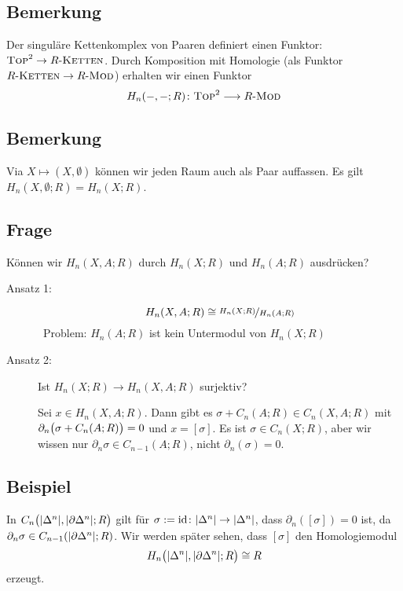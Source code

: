 \subsection[Definition: Der singuläre Kettenkomplex von Paaren definiert einen Funktor]{Bemerkung} %
\label{sub:83}
Der singuläre Kettenkomplex von Paaren definiert einen Funktor: $\TOP^2 \to R\text{-}\textsc{Ketten}$. Durch Komposition mit Homologie (als Funktor 
$R\text{-}\textsc{Ketten} \to R\text{-}\MOD$) erhalten wir einen Funktor
\[
	H_n(-,-;R) \colon \TOP^2 \longrightarrow R\text{-}\MOD
\]

\subsection[Bemerkung: Topologische Räume als Paar auffassen]{Bemerkung} %
\label{sub:84}
Via $X \mapsto (X,\emptyset)$ können wir jeden Raum auch als Paar auffassen. Es gilt $H_n(X,\emptyset;R) = H_n(X;R)$.

\subsection[Frage: Können wir $H_n(X,A;R)$ durch $H_n(X;R)$ und $H_n(A;R)$ ausdrücken?]{Frage} %
\label{sub:85}
Können wir $H_n(X,A;R)$ durch $H_n(X;R)$ und $H_n(A;R)$ ausdrücken? 
\begin{description}
	\item[Ansatz 1:] 
	\[
		H_n(X,A;R) \cong \nicefrac{H_n(X;R)}{H_n(A;R)}
	\]
	\ifxetexorluatex \faWarningSign \fi \, Problem: $H_n(A;R)$ ist kein Untermodul von $H_n(X;R)$
	\item[Ansatz 2:] Ist $H_n(X;R) \to H_n(X,A;R)$ surjektiv?
	
	Sei $x \in H_n(X,A;R)$. Dann gibt es $\sigma + C_n(A;R) \in C_n(X,A;R)$ mit $\partial_n \enbrace[\big]{\sigma + C_n(A;R)} = 0$ und $x= [\sigma]$. Es ist 
	$\sigma \in C_n(X;R)$, aber wir wissen nur $\partial_n \sigma \in C_{n-1}(A;R)$, nicht $\partial_n(\sigma)= 0$. \hfill \ifxetexorluatex {\large \faMeh} \fi
\end{description}

\subsection[Beispiel: Homologie des Paares $(\abs*{\Delta^n}, \abs*{\partial \Delta^n})$]{Beispiel} %
\label{sub:86}
In $C_n \enbrace[\big]{\abs*{\Delta^n}, \abs*{\partial \Delta^n};R}$ gilt für $\sigma := \id \colon \abs*{\Delta^n} \to \abs*{\Delta^n}$, dass $\partial_n([\sigma])=0$ ist, da 
$\partial_n \sigma \in C_{n-1} \enbrace*{\abs*{\partial \Delta^n};R}$. Wir werden später sehen, dass $[\sigma]$ den Homologiemodul
\[
	H_n \enbrace[\big]{\abs*{\Delta^n}, \abs*{\partial \Delta^n};R  } \cong R 
\]
erzeugt.

